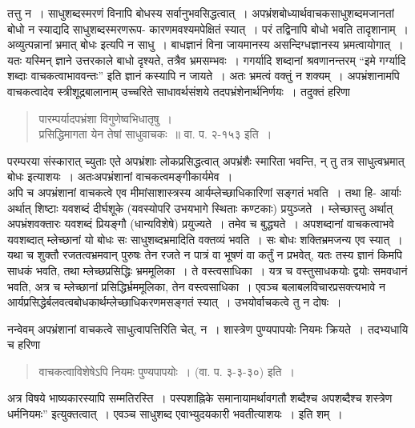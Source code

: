 {तत्तु न~। साधुशब्दस्मरणं विनापि बोधस्य सर्वानुभवसिद्धत्वात्~। अपभ्रंशबोध्यार्थवाचकसाधुशब्दमजानतां बोधो न स्याद्यदि साधुशब्दस्मरणरूप- कारणमवश्यमपेक्षितं स्यात्~। परं तद्विनापि बोधो भवति तादृशानाम्~। अव्युत्पन्नानां भ्रमात् बोधः इत्यपि न साधु~। बाधज्ञानं विना जायमानस्य असन्दिग्धज्ञानस्य भ्रमत्वायोगात्~। यतः यस्मिन् ज्ञाने उत्तरकाले बाधो दृश्यते, तत्रैव भ्रमसम्भवः~। गगर्यादि शब्दानां श्रवणानन्तरम् “इमे गर्ग्यादि शब्दाः वाचकत्वाभाववन्तः” इति ज्ञानं कस्यापि न जायते~। अतः भ्रमत्वं वक्तुं न शक्यम्~। अपभ्रंशानामपि वाचकत्वादेव स्त्रीशूद्रबालानाम् उच्चरिते साधावर्थसंशये तदपभ्रंशेनार्थनिर्णयः~। तदुक्तं हरिणा\enginline{-}
\begin{verse}
पारम्पर्यादपभ्रंशा विगुणेष्वभिधातृषु~। \\
प्रसिद्धिमागता येन तेषां साधुवाचकः~॥ वा. प. २-१५३ इति~। 
\end{verse}
परम्परया संस्कारात् च्युताः एते अपभ्रंशाः लोकप्रसिद्धत्वात्  अपभ्रंशैः स्मारिता भवन्ति, न् तु तत्र साधुत्वभ्रमात् बोधः इत्याशयः~। अतःअपभ्रंशानां वाचकत्वमङ्गीकार्यमेव~।\\

अपि च अपभ्रंशानां वाचकत्वे एव मीमांसाशास्त्रस्य आर्यम्लेच्छाधिकारिणां सङ्गतं भवति~। तथा हि- आर्याः अर्थात् शिष्टाः यवशब्दं दीर्घशूके (यवस्योपरि उभयभागे स्थिताः कण्टकाः) प्रयुञ्जते~। म्लेच्छास्तु अर्थात् अपभ्रंशवक्तारः यवशब्दं प्रियङ्गौ (धान्यविशेषे) प्रयुज्यते~। तमेव च बुद्ध्यते~। अपशब्दानां वाचकत्वाभवे यवशब्दात् म्लेच्छानां यो बोधः सः साधुशब्दभ्रमादिति वक्तव्यं भवति~। सः बोधः शक्तिभ्रमजन्य एव स्यात्~। यथा च शुक्तौ रजतत्वभ्रमवान् पुरुषः तेन रजते न पात्रं वा भूषणं वा कर्तुं न प्रभवेत्, यतः तस्य ज्ञानं किमपि साधकं भवति, तथा म्लेच्छप्रसिद्धिः भ्रममूलिका~। ते वस्त्वसाधिका~। यत्र च वस्तुसाधकयोः द्वयोः समवधानं भवति, अत्र च म्लेच्छानां प्रसिद्धिर्भ्रममूलिका, तेन वस्त्वसाधिका~। एवञ्च बलाबलविचारप्रसक्त्यभावे न आर्यप्रसिद्धेर्बलवत्वबोधकार्थम्लेच्छाधिकरणमसङ्गतं स्यात्~। उभयोर्वाचकत्वे तु न दोषः~। 

नन्वेवम् अपभ्रंशानां वाचकत्वे साधुत्वापत्तिरिति चेत्, न~। शास्त्रेण पुण्यपापयोः नियमः क्रियते~। तदभ्यधायि च हरिणा\enginline{-}
\begin{verse}
वाचकत्वाविशेषेऽपि नियमः पुण्यपापयोः~। (वा. प. ३-३-३०) इति~। 
\end{verse}
अत्र विषये भाष्यकारस्यापि सम्मतिरस्ति~। पस्पशाह्निके समानायामर्थावगतौ शब्दैश्च अपशब्दैश्च शस्त्रेण धर्मनियमः” इत्युक्तत्वात्~। एवञ्च साधुशब्द एवाभ्युदयकारी भवतीत्याशयः~। इति शम्~। 

\articleend
}
